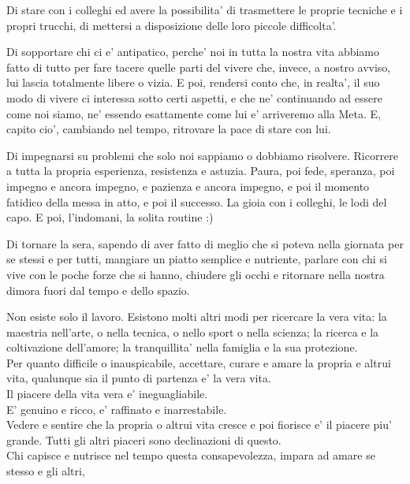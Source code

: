 Di stare con i colleghi ed avere la possibilita' di trasmettere le proprie tecniche e i propri trucchi, di mettersi a disposizione delle loro piccole difficolta'.

Di sopportare chi ci e' antipatico, perche' noi in tutta la nostra vita abbiamo fatto di tutto per fare tacere quelle parti del vivere che, invece, a nostro avviso, lui lascia totalmente libere o vizia. E poi, rendersi conto che, in realta', il suo modo di vivere ci interessa sotto certi aspetti, e che ne' continuando ad essere come noi siamo, ne' essendo esattamente come lui e' arriveremo alla Meta. E, capito cio', cambiando nel tempo, ritrovare la pace di stare con lui.

Di impegnarsi su problemi che solo noi sappiamo o dobbiamo risolvere. Ricorrere a tutta la propria esperienza, resistenza e astuzia. Paura, poi fede, speranza, poi impegno e ancora impegno, e pazienza e ancora impegno, e poi il momento fatidico della messa in atto, e poi il successo. La gioia con i colleghi, le lodi del capo. E poi, l'indomani, la solita routine :)

Di tornare la sera, sapendo di aver fatto di meglio che si poteva nella giornata per se stessi e per tutti, mangiare un piatto semplice e nutriente, parlare con chi si vive con le poche forze che si hanno, chiudere gli occhi e ritornare nella nostra dimora fuori dal tempo e dello spazio.

Non esiste solo il lavoro. Esistono molti altri modi per ricercare la vera vita: la maestria nell'arte, o nella tecnica, o nello sport o nella scienza; la ricerca e la coltivazione dell'amore; la tranquillita' nella famiglia e la sua protezione.\\

Per quanto difficile o inauspicabile, accettare, curare e amare la propria e altrui vita, qualunque sia il punto di partenza e' la vera vita.\\

Il piacere della vita vera e' ineguagliabile.\\
E' genuino e ricco, e' raffinato e inarrestabile.\\

Vedere e sentire che la propria o altrui vita cresce e poi fiorisce e' il piacere piu' grande.
Tutti gli altri piaceri sono declinazioni di questo.\\

Chi capisce e nutrisce nel tempo questa consapevolezza, impara ad amare se stesso e gli altri,

